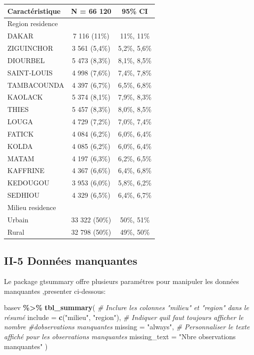\documentclass[
]{article}
\newenvironment{Shaded}{\begin{snugshade}}{\end{snugshade}}
\newcommand{\AttributeTok}[1]{\textcolor[rgb]{0.13,0.29,0.53}{#1}}
\newcommand{\CommentTok}[1]{\textcolor[rgb]{0.56,0.35,0.01}{\textit{#1}}}
\newcommand{\FunctionTok}[1]{\textcolor[rgb]{0.13,0.29,0.53}{\textbf{#1}}}
\newcommand{\NormalTok}[1]{#1}
\newcommand{\SpecialCharTok}[1]{\textcolor[rgb]{0.81,0.36,0.00}{\textbf{#1}}}
\newcommand{\StringTok}[1]{\textcolor[rgb]{0.31,0.60,0.02}{#1}}
\begin{document}
\begin{longtable}[]{@{}lcc@{}}
\toprule\noalign{}
\textbf{Caractéristique} & \textbf{N = 66 120} & \textbf{95\% CI} \\
\midrule\noalign{}
\endhead
\bottomrule\noalign{}
\endlastfoot
Region residence & & \\
DAKAR & 7 116 (11\%) & 11\%, 11\% \\
ZIGUINCHOR & 3 561 (5,4\%) & 5,2\%, 5,6\% \\
DIOURBEL & 5 473 (8,3\%) & 8,1\%, 8,5\% \\
SAINT-LOUIS & 4 998 (7,6\%) & 7,4\%, 7,8\% \\
TAMBACOUNDA & 4 397 (6,7\%) & 6,5\%, 6,8\% \\
KAOLACK & 5 374 (8,1\%) & 7,9\%, 8,3\% \\
THIES & 5 457 (8,3\%) & 8,0\%, 8,5\% \\
LOUGA & 4 729 (7,2\%) & 7,0\%, 7,4\% \\
FATICK & 4 084 (6,2\%) & 6,0\%, 6,4\% \\
KOLDA & 4 085 (6,2\%) & 6,0\%, 6,4\% \\
MATAM & 4 197 (6,3\%) & 6,2\%, 6,5\% \\
KAFFRINE & 4 367 (6,6\%) & 6,4\%, 6,8\% \\
KEDOUGOU & 3 953 (6,0\%) & 5,8\%, 6,2\% \\
SEDHIOU & 4 329 (6,5\%) & 6,4\%, 6,7\% \\
Milieu residence & & \\
Urbain & 33 322 (50\%) & 50\%, 51\% \\
Rural & 32 798 (50\%) & 49\%, 50\% \\
\end{longtable}

\hypertarget{ii-5-donnuxe9es-manquantes}{%
\subsection{II-5 Données manquantes}\label{ii-5-donnuxe9es-manquantes}}

Le package gtsummary offre plusieurs paramétres pour manipuler les
données manquantes ,presenter ci-dessous:

\begin{Shaded}
\begin{Highlighting}[]
\NormalTok{basev }\SpecialCharTok{\%\textgreater{}\%}
  \FunctionTok{tbl\_summary}\NormalTok{(}
    \CommentTok{\# Inclure les colonnes "milieu" et "region" dans le résumé}
    \AttributeTok{include =} \FunctionTok{c}\NormalTok{(}\StringTok{"milieu"}\NormalTok{, }\StringTok{"region"}\NormalTok{),}
    \CommentTok{\# Indiquer qu\textquotesingle{}il faut toujours afficher le nombre }
    \CommentTok{\#d\textquotesingle{}observations manquantes}
    \AttributeTok{missing =} \StringTok{"always"}\NormalTok{,}
    \CommentTok{\# Personnaliser le texte affiché pour les observations manquantes}
    \AttributeTok{missing\_text =} \StringTok{"Nbre observations manquantes"}
\NormalTok{  )}
\end{Highlighting}
\end{Shaded}
\end{document}

